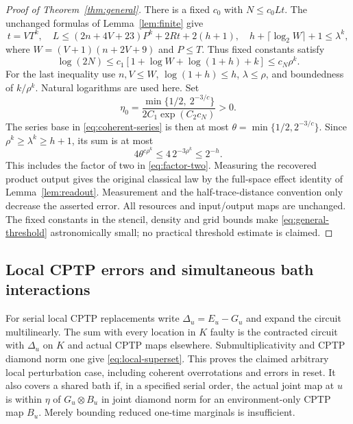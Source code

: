 \begin{proof}[Proof of Theorem~\ref{thm:general}]
There is a fixed $c_0$ with $N\le c_0Lt$. The unchanged formulas of Lemma~\ref{lem:finite} give
\[
 t=VT^k,\quad
 L\le(2n+4V+23)P^k+2Rt+2(h+1),\quad
 h+\lceil\log_2W\rceil+1\le\lambda^k,
\]
where $W=(V+1)(n+2V+9)$ and $P\le T$. Thus fixed constants satisfy
\[
 \log(2N)\le c_1[1+\log W+\log(1+h)+k]
 \le c_N\rho^k.
\]
For the last inequality use $n,V\le W$, $\log(1+h)\le h$, $\lambda\le\rho$, and boundedness of $k/\rho^k$. Natural logarithms are used here. Set
\begin{equation}\label{eq:general-threshold}
 \eta_0=\frac{\min\{1/2,\ 2^{-3/c}\}}
 {2C_1\exp(C_2c_N)}>0.
\end{equation}
The series base in \eqref{eq:coherent-series} is then at most $\theta=\min\{1/2,2^{-3/c}\}$. Since $\rho^k\ge\lambda^k\ge h+1$, its sum is at most
\[
 4\theta^{c\rho^k}\le4\,2^{-3\rho^k}\le2^{-h}.
\]
This includes the factor of two in \eqref{eq:factor-two}. Measuring the recovered product output gives the original classical law by the full-space effect identity of Lemma~\ref{lem:readout}. Measurement and the half-trace-distance convention only decrease the asserted error. All resources and input/output maps are unchanged. The fixed constants in the stencil, density and grid bounds make \eqref{eq:general-threshold} astronomically small; no practical threshold estimate is claimed.
\end{proof}

\subsection{Local CPTP errors and simultaneous bath interactions}
For serial local CPTP replacements write $\Delta_u=E_u-G_u$ and expand the circuit multilinearly. The sum with every location in $K$ faulty is the contracted circuit with $\Delta_u$ on $K$ and actual CPTP maps elsewhere. Submultiplicativity and CPTP diamond norm one give \eqref{eq:local-superset}. This proves the claimed arbitrary local perturbation case, including coherent overrotations and errors in reset. It also covers a shared bath if, in a specified serial order, the actual joint map at $u$ is within $\eta$ of $G_u\otimes B_u$ in joint diamond norm for an environment-only CPTP map $B_u$. Merely bounding reduced one-time marginals is insufficient.


